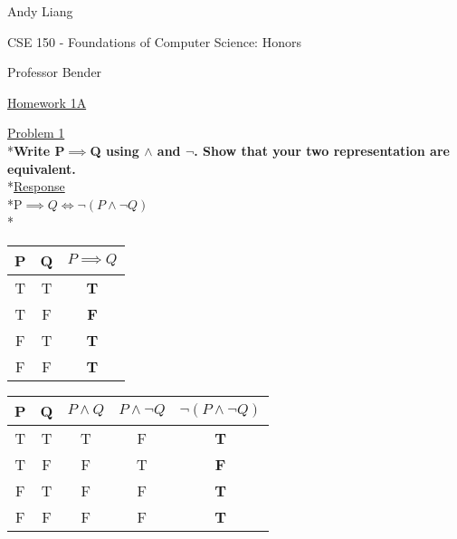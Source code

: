 \documentclass[12pt]{article}
\begin{document}
\begin{flushleft}
Andy Liang

CSE 150 - Foundations of Computer Science: Honors

Professor Bender
\end{flushleft}
\medskip
\centerline{\uline{Homework 1A}}
\bigskip\bigskip

\noindent
\uline{Problem 1}
\\*\textbf{Write P$\implies$Q using $\land$ and $\neg$. Show that your two representation are equivalent.}
\medskip
\\*\uline{Response}
\\*P$\implies Q\iff \neg (P \land \neg Q)$
\bigskip
\\*
\begin{tabular}{c|c|c}
P & Q & $P \implies Q$\\
\hline
T & T & \textbf{T}\\
T & F & \textbf{F}\\
F & T & \textbf{T}\\
F & F & \textbf{T}\\
\end{tabular} 
\qquad\qquad
\begin{tabular}{c|c|c|c|c}
P & Q & $P \land Q$ &$P \land \neg Q$ & $\neg (P \land \neg Q)$\\
\hline
T & T & T & F & \textbf{T}\\
T & F & F & T & \textbf{F}\\
F & T & F & F & \textbf{T}\\
F & F & F & F & \textbf{T}\\

\end{tabular}
\bigskip\bigskip
\end{document}

